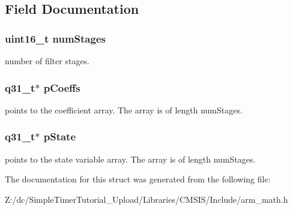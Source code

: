\subsection{Field Documentation}
\hypertarget{structarm__fir__lattice__instance__q31_a4cceb90547b3e585d4c7aabaa8057212}{
\subsubsection[{num\-Stages}]{\setlength{\rightskip}{0pt plus 5cm}uint16\-\_\-t num\-Stages}}\label{structarm__fir__lattice__instance__q31_a4cceb90547b3e585d4c7aabaa8057212}
number of filter stages. \hypertarget{structarm__fir__lattice__instance__q31_a68888e36167d81cb7836db10367a1682}{
\subsubsection[{p\-Coeffs}]{\setlength{\rightskip}{0pt plus 5cm}q31\-\_\-t$\ast$ p\-Coeffs}}\label{structarm__fir__lattice__instance__q31_a68888e36167d81cb7836db10367a1682}
points to the coefficient array. The array is of length num\-Stages. \hypertarget{structarm__fir__lattice__instance__q31_adee4ba3ee8869865af7d8fa08ca913d6}{
\subsubsection[{p\-State}]{\setlength{\rightskip}{0pt plus 5cm}q31\-\_\-t$\ast$ p\-State}}\label{structarm__fir__lattice__instance__q31_adee4ba3ee8869865af7d8fa08ca913d6}
points to the state variable array. The array is of length num\-Stages. 

The documentation for this struct was generated from the following file\-:\begin{DoxyCompactItemize}
\item 
Z\-:/dc/\-Simple\-Timer\-Tutorial\-\_\-\-Upload/\-Libraries/\-C\-M\-S\-I\-S/\-Include/arm\-\_\-math.\-h\end{DoxyCompactItemize}
